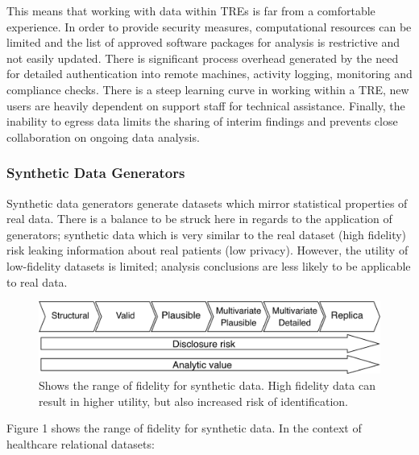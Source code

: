 \documentclass[11pt]{article}
\begin{document}
This means that working with data within TREs is far from a comfortable experience. In order to provide security measures, computational resources can be limited and the list of approved software packages for analysis is restrictive and not easily updated. There is significant process overhead generated by the need for detailed authentication into remote machines, activity logging, monitoring and compliance checks. There is a steep learning curve in working within a TRE, new users are heavily dependent on support staff for technical assistance. Finally, the inability to egress data limits the sharing of interim findings and prevents close collaboration on ongoing data analysis. 

\subsubsection{Synthetic Data Generators}

Synthetic data generators generate datasets which mirror statistical properties of real data. There is a balance to be struck here in regards to the application of generators; synthetic data which is very similar to the real dataset (high fidelity) risk leaking information about real patients (low privacy). However, the utility of low-fidelity datasets is limited; analysis conclusions are less likely to be applicable to real data.

\begin{figure}[ht]
\centering
\includegraphics[width=0.8\linewidth]{figures/ONS.png}
\caption{Shows the range of fidelity for synthetic data. High fidelity data can result in higher utility, but also increased risk of identification.}
\label{fig:Range of fidelity for synthetic data}
\end{figure}

Figure 1 shows the range of fidelity for synthetic data. In the context of healthcare relational datasets: 
\end{document}

